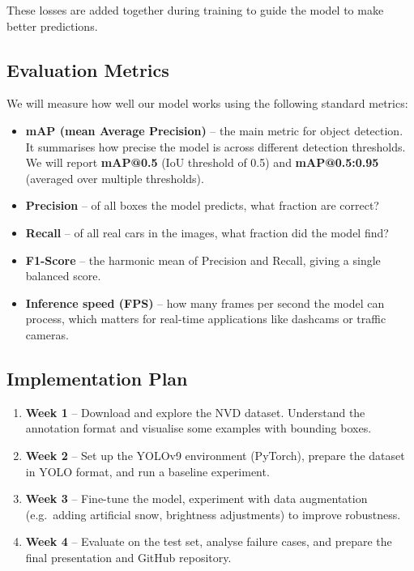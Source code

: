 These losses are added together during training to guide the model to make better predictions.
 
\subsection{Evaluation Metrics}
 
We will measure how well our model works using the following standard metrics:
 
\begin{itemize}
    \item \textbf{mAP (mean Average Precision)} -- the main metric for object detection.
          It summarises how precise the model is across different detection thresholds.
          We will report \textbf{mAP@0.5} (IoU threshold of 0.5) and
          \textbf{mAP@0.5:0.95} (averaged over multiple thresholds).
 
    \item \textbf{Precision} -- of all boxes the model predicts, what fraction are correct?
 
    \item \textbf{Recall} -- of all real cars in the images, what fraction did the model find?
 
    \item \textbf{F1-Score} -- the harmonic mean of Precision and Recall, giving a single
          balanced score.
 
    \item \textbf{Inference speed (FPS)} -- how many frames per second the model can process,
          which matters for real-time applications like dashcams or traffic cameras.
\end{itemize}
 
\subsection{Implementation Plan}
 
\begin{enumerate}
    \item \textbf{Week 1} -- Download and explore the NVD dataset. Understand the annotation
          format and visualise some examples with bounding boxes.
    \item \textbf{Week 2} -- Set up the YOLOv9 environment (PyTorch), prepare the dataset in
          YOLO format, and run a baseline experiment.
    \item \textbf{Week 3} -- Fine-tune the model, experiment with data augmentation (e.g.\
          adding artificial snow, brightness adjustments) to improve robustness.
    \item \textbf{Week 4} -- Evaluate on the test set, analyse failure cases, and prepare
          the final presentation and GitHub repository.
\end{enumerate}
 
